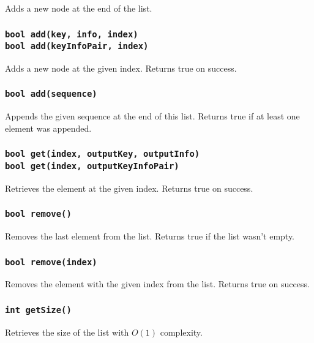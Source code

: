 ﻿\documentclass{article}
\begin{document}
Adds a new node at the end of the list.

\subsubsection{{\tt bool add(key, info, index)}\\
{\tt bool add(keyInfoPair, index)}}

Adds a new node at the given index. Returns true on success.

\subsubsection{{\tt bool add(sequence)}}

Appends the given sequence at the end of this list. Returns true if at least one
element was appended.

\subsubsection{{\tt bool get(index, outputKey, outputInfo)}\\
{\tt bool get(index, outputKeyInfoPair)}}

Retrieves the element at the given index. Returns true on success.

\subsubsection{{\tt bool remove()}}

Removes the last element from the list. Returns true if the list wasn't empty.

\subsubsection{{\tt bool remove(index)}}

Removes the element with the given index from the list. Returns true on success.

\subsubsection{{\tt int getSize()}}

Retrieves the size of the list with $O(1)$ complexity.
\end{document}
